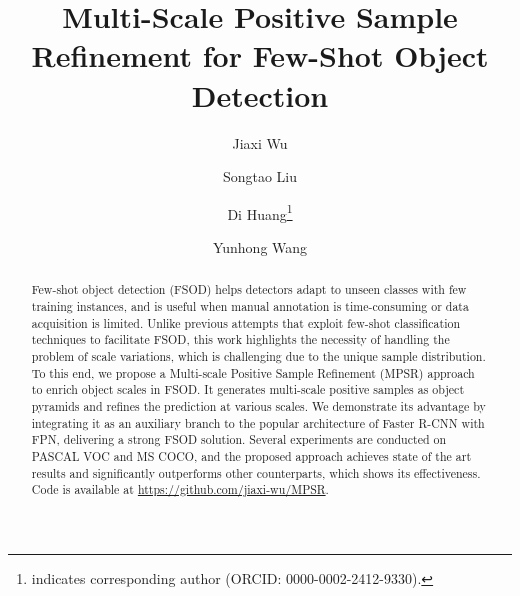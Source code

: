 \documentclass[runningheads]{llncs}
\begin{document}
\pagestyle{headings}
\mainmatter
\def\ECCVSubNumber{2581}  

\title{Multi-Scale Positive Sample Refinement for Few-Shot Object Detection} 

\begin{comment}
\titlerunning{ECCV-20 submission ID \ECCVSubNumber} 
\authorrunning{ECCV-20 submission ID \ECCVSubNumber} 
\author{Anonymous ECCV submission}
\institute{Paper ID \ECCVSubNumber}
\end{comment}
\renewcommand{\thefootnote}{*}
\author{Jiaxi Wu \and
Songtao Liu \and
Di Huang\thanks{indicates corresponding author (ORCID: 0000-0002-2412-9330).} \and
Yunhong Wang}
\maketitle

\begin{abstract}
Few-shot object detection (FSOD) helps detectors adapt to unseen classes with few training instances, and is useful when manual annotation is time-consuming or data acquisition is limited.
Unlike previous attempts that exploit few-shot classification techniques to facilitate FSOD, this work highlights the necessity of handling the problem of scale variations, which is challenging due to the unique sample distribution.
To this end, we propose a Multi-scale Positive Sample Refinement (MPSR) approach to enrich object scales in FSOD. 
It generates multi-scale positive samples as object pyramids and refines the prediction at various scales. 
We demonstrate its advantage by integrating it as an auxiliary branch to the popular architecture of Faster R-CNN with FPN, delivering a strong FSOD solution. 
Several experiments are conducted on PASCAL VOC and MS COCO, and the proposed approach achieves state of the art results and significantly  outperforms other counterparts, which shows its effectiveness.
Code is available at \href{https://github.com/jiaxi-wu/MPSR}{https://github.com/jiaxi-wu/MPSR}.
\end{abstract}
\end{document}
